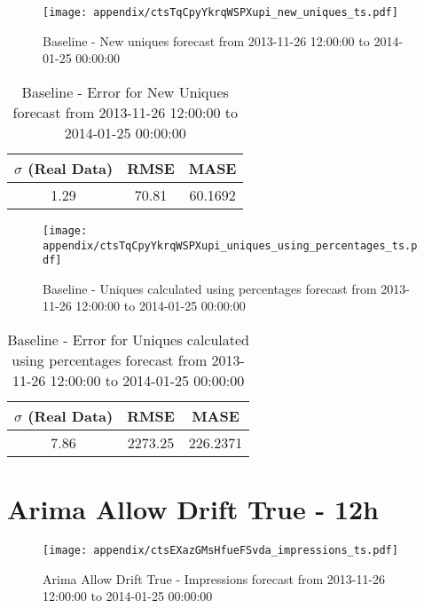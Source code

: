 \begin{figure}[H] \begin{center} \leavevmode
\texttt{[image: appendix/ctsTqCpyYkrqWSPXupi\_new\_uniques\_ts.pdf]} \caption[]{
Baseline - New uniques forecast from 2013-11-26 12:00:00 to 2014-01-25 00:00:00} \label{fig:appendix/ctsTqCpyYkrqWSPXupi_new_uniques_ts.pdf} \end{center}
\end{figure}

\begin{table}[H]
\centering
\footnotesize
\begin{tabular}{ccc}
$\sigma$ (Real Data) & RMSE & MASE   \\ \hline
1.29 & 70.81 & 60.1692 \\
\end{tabular}

\vspace{0.5cm}

\caption[]{
Baseline - Error for New Uniques forecast from 2013-11-26 12:00:00 to 2014-01-25 00:00:00}
\end{table}

\begin{figure}[H] \begin{center} \leavevmode
\texttt{[image: appendix/ctsTqCpyYkrqWSPXupi\_uniques\_using\_percentages\_ts.pdf]} \caption[]{
Baseline - Uniques calculated using percentages forecast from 2013-11-26 12:00:00 to 2014-01-25 00:00:00} \label{fig:appendix/ctsTqCpyYkrqWSPXupi_uniques_using_percentages_ts.pdf} \end{center}
\end{figure}

\begin{table}[H]
\centering
\footnotesize
\begin{tabular}{ccc}
$\sigma$ (Real Data) & RMSE & MASE   \\ \hline
7.86 & 2273.25 & 226.2371 \\
\end{tabular}

\vspace{0.5cm}

\caption[]{
Baseline - Error for Uniques calculated using percentages forecast from 2013-11-26 12:00:00 to 2014-01-25 00:00:00}
\end{table}

\section{Arima Allow Drift True - 12h}
\begin{figure}[H] \begin{center} \leavevmode
\texttt{[image: appendix/ctsEXazGMsHfueFSvda\_impressions\_ts.pdf]} \caption[]{
Arima Allow Drift True - Impressions forecast from 2013-11-26 12:00:00 to 2014-01-25 00:00:00} \label{fig:appendix/ctsEXazGMsHfueFSvda_impressions_ts.pdf} \end{center}
\end{figure}

